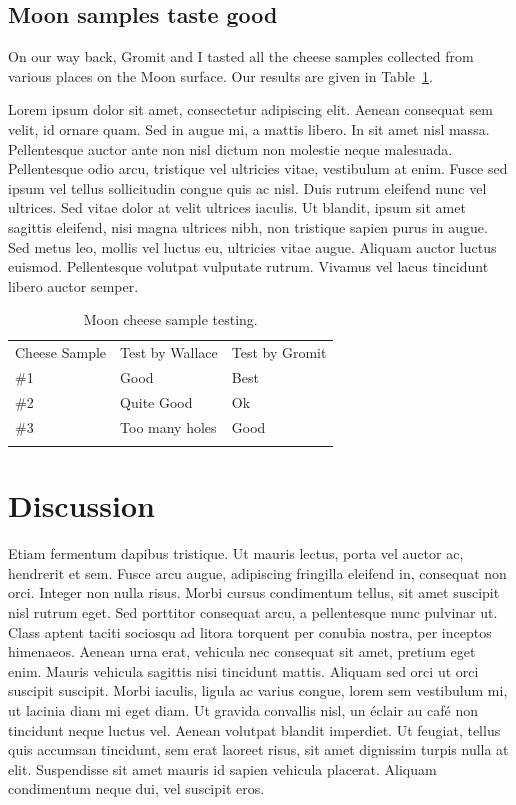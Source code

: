 \documentclass[final,12pt]{article}
\begin{document}
\subsection{Moon samples taste good}

On our way back, Gromit and I tasted all the cheese samples collected
from various places on the Moon surface. Our results are given in
Table~\ref{tab:results}. 

Lorem ipsum dolor sit amet, consectetur adipiscing elit. Aenean
consequat sem velit, id ornare quam. Sed in augue mi, a mattis
libero. In sit amet nisl massa. Pellentesque auctor ante non nisl
dictum non molestie neque malesuada. Pellentesque odio arcu, tristique
vel ultricies vitae, vestibulum at enim. Fusce sed ipsum vel tellus
sollicitudin congue quis ac nisl. Duis rutrum eleifend nunc vel
ultrices. Sed vitae dolor at velit ultrices iaculis. Ut blandit, ipsum
sit amet sagittis eleifend, nisi magna ultrices nibh, non tristique
sapien purus in augue. Sed metus leo, mollis vel luctus eu, ultricies
vitae augue. Aliquam auctor luctus euismod. Pellentesque volutpat
vulputate rutrum. Vivamus vel lacus tincidunt libero auctor semper.

\begin{table}[h]
\begin{center}
\begin{tabular}{l|ll}
\hline
\noalign{\smallskip}
Cheese Sample & Test by Wallace &  Test by Gromit \\
\noalign{\smallskip}
\hline
\noalign{\smallskip}
\#1 & Good           & Best \\
\#2 & Quite Good     & Ok \\ 
\#3 & Too many holes & Good \\ 
\noalign{\smallskip}
\hline
\end{tabular}
\caption{Moon cheese sample testing.}\label{tab:results}   %
\end{center}
\end{table}


\section{Discussion}

Etiam fermentum dapibus tristique. Ut mauris lectus, porta vel auctor
ac, hendrerit et sem. Fusce arcu augue, adipiscing fringilla eleifend
in, consequat non orci. Integer non nulla risus. Morbi cursus
condimentum tellus, sit amet suscipit nisl rutrum eget. Sed porttitor
consequat arcu, a pellentesque nunc pulvinar ut. Class aptent taciti
sociosqu ad litora torquent per conubia nostra, per inceptos
himenaeos. Aenean urna erat, vehicula nec consequat sit amet, pretium
eget enim. Mauris vehicula sagittis nisi tincidunt mattis. Aliquam sed
orci ut orci suscipit suscipit. Morbi iaculis, ligula ac varius
congue, lorem sem vestibulum mi, ut lacinia diam mi eget diam. Ut
gravida convallis nisl, un éclair au café non tincidunt neque luctus vel. Aenean
volutpat blandit imperdiet. Ut feugiat, tellus quis accumsan
tincidunt, sem erat laoreet risus, sit amet dignissim turpis nulla at
elit. Suspendisse sit amet mauris id sapien vehicula placerat. Aliquam
condimentum neque dui, vel suscipit eros.
\end{document}
